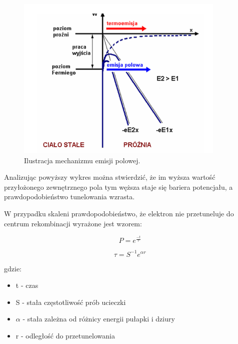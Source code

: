 \begin{figure}[H]
\centering
\includegraphics[width=10cm]{tunelowanie}
\caption{Ilustracja mechanizmu emisji polowej.}
\label{fig:Tunelowanie}
\end{figure}



Analizując powyższy wykres można stwierdzić, że im wyższa wartość przyłożonego zewnętrznego pola tym węższa staje się bariera potencjału, a prawdopodobieństwo tunelowania wzrasta. 

W przypadku skaleni prawdopodobieństwo, że elektron nie przetuneluje do centrum rekombinacji wyrażone jest wzorem:

\begin{equation}
\label{eq:1}
P = e^{\frac{-t}{\tau}}
\end{equation}

\begin{equation}
\tau = S^{-1}e^{\alpha r}
\end{equation}


gdzie:
\begin{itemize}
\item t - czas
\item S - stała częstotliwość prób ucieczki
\item $\alpha$ -  stała zależna od różnicy energii pułapki i dziury
\item r - odległość do przetunelowania
\end{itemize}






